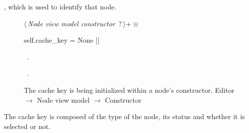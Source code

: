 \documentclass[%
    a4paper,    %
    justified,  %
    nobib,      %
    openany     %
]{tufte-book}
\begin{document}
, which is used to identify that
node.

\begin{figure}
\begin{flushleft} \small
\begin{minipage}{\linewidth}\label{scrap74}\raggedright\small
{} $\langle\,${\itshape Node view model constructor}\nobreak\ {\footnotesize {?}}$\,\rangle+\equiv$
\vspace{-1ex}
\begin{pythoncode}
    self.cache_key = None
|\NWsep|
\end{pythoncode}
\vspace{1.5ex}
\footnotesize
\begin{list}{}{\setlength{\itemsep}{-\parsep}\setlength{\itemindent}{-\leftmargin}}
\item \NWtxtMacroDefBy\ .
\item \NWtxtMacroRefIn\ .

\item{}
\end{list}
\end{minipage}\vspace{4ex}
\end{flushleft}
\caption{The cache key is being initialized within a node's constructor.
  \newline{}\newline{}Editor $\rightarrow$ Node view model $\rightarrow$
  Constructor}
\label{editor:lst:node-view-model:constructor:cache-key}
\end{figure}

The cache key is composed of the type of the node, its status and whether it is
selected or not.
\end{document}
